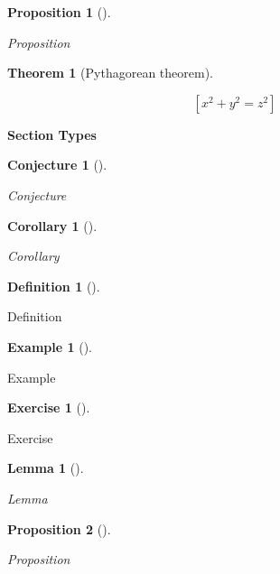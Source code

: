\documentclass[
  12pt,
  a4paper,
  oneside,
  numbers=noenddot,
  titlepage,
  toclink=all,
  toc=bibliography]{scrbook}
\theoremstyle{definition}
\newtheorem{definition}{Definition}[section]
\theoremstyle{definition}
\newtheorem{example}{Example}[section]
\theoremstyle{definition}
\newtheorem{exercise}{Exercise}[section]
\theoremstyle{plain}
\newtheorem{proposition}{Proposition}[section]
\theoremstyle{plain}
\newtheorem{lemma}{Lemma}[section]
\theoremstyle{plain}
\newtheorem{conjecture}{Conjecture}[section]
\theoremstyle{plain}
\newtheorem{corollary}{Corollary}[section]
\theoremstyle{plain}
\newtheorem{theorem}{Theorem}[section]
\theoremstyle{remark}
\begin{document}
\begin{proposition}[]\protect\hypertarget{prp-scriv4}{}\label{prp-scriv4}

Proposition

\end{proposition}

\begin{theorem}[Pythagorean
theorem]\protect\hypertarget{thm-scriv4}{}\label{thm-scriv4}

\[[ x^2 + y^2 = z^2 ]\]

\end{theorem}

\textbf{Section Types}

\begin{conjecture}[]\protect\hypertarget{cnj-scriv5}{}\label{cnj-scriv5}

Conjecture

\end{conjecture}

\begin{corollary}[]\protect\hypertarget{cor-scriv6}{}\label{cor-scriv6}

Corollary

\end{corollary}

\begin{definition}[]\protect\hypertarget{def-scriv7}{}\label{def-scriv7}

Definition

\end{definition}

\begin{example}[]\protect\hypertarget{exm-scriv8}{}\label{exm-scriv8}

Example

\end{example}

\begin{exercise}[]\protect\hypertarget{exr-scriv9}{}\label{exr-scriv9}

Exercise

\end{exercise}

\begin{lemma}[]\protect\hypertarget{lem-scriv10}{}\label{lem-scriv10}

Lemma

\end{lemma}

\begin{proposition}[]\protect\hypertarget{prp-scriv11}{}\label{prp-scriv11}

Proposition

\end{proposition}
\end{document}
